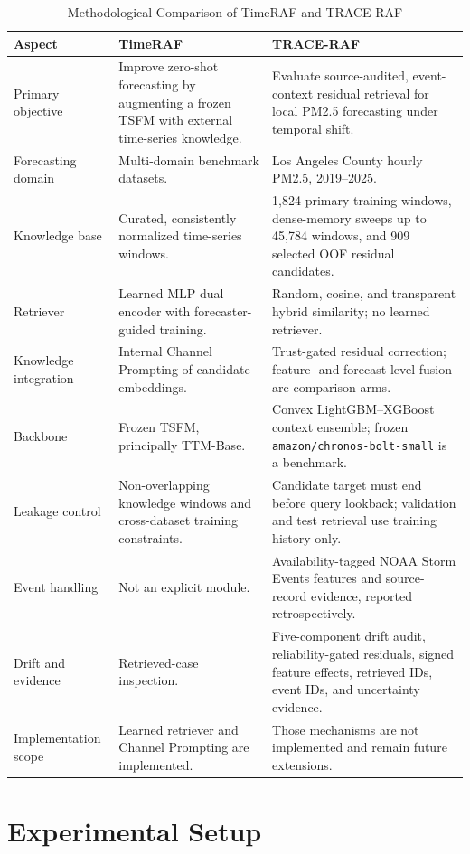 \documentclass{ieeeaccess}
\begin{document}
\begin{table}[!t]
\centering
\caption{Methodological Comparison of TimeRAF and TRACE-RAF}
\label{tab:timeraf_comparison}
\begin{tabular}{p{}p{}p{}}
\toprule
Aspect & TimeRAF & TRACE-RAF \\
\midrule
Primary objective & Improve zero-shot forecasting by augmenting a frozen TSFM
with external time-series knowledge. & Evaluate source-audited, event-context
residual retrieval for local PM2.5 forecasting under temporal shift. \\
Forecasting domain & Multi-domain benchmark datasets. & Los Angeles County
hourly PM2.5, 2019--2025. \\
Knowledge base & Curated, consistently normalized time-series windows. & 1,824
primary training windows, dense-memory sweeps up to 45,784 windows, and 909
selected OOF residual candidates. \\
Retriever & Learned MLP dual encoder with forecaster-guided training. & Random,
cosine, and transparent hybrid similarity; no learned retriever. \\
Knowledge integration & Internal Channel Prompting of candidate embeddings. &
Trust-gated residual correction; feature- and forecast-level fusion are
comparison arms. \\
Backbone & Frozen TSFM, principally TTM-Base. & Convex LightGBM--XGBoost context
ensemble; frozen \texttt{amazon/chronos-bolt-small} is a benchmark. \\
Leakage control & Non-overlapping knowledge windows and cross-dataset training
constraints. & Candidate target must end before query lookback; validation and
test retrieval use training history only. \\
Event handling & Not an explicit module. & Availability-tagged NOAA Storm
Events features and source-record evidence, reported retrospectively. \\
Drift and evidence & Retrieved-case inspection. & Five-component drift
audit, reliability-gated residuals, signed feature effects, retrieved IDs,
event IDs, and uncertainty evidence. \\
Implementation scope & Learned retriever and Channel Prompting are implemented.
& Those mechanisms are not implemented and remain future extensions. \\
\bottomrule
\end{tabular}
\end{table}
\section{Experimental Setup}
\end{document}
